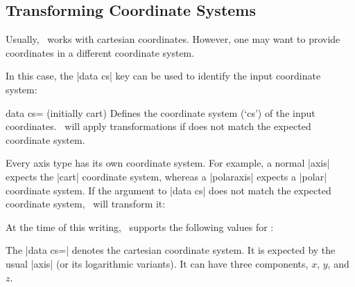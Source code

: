 \subsection{Transforming Coordinate Systems}
\label{key:data:cs}
Usually, \PGFPlots\ works with cartesian coordinates. However, one may want to provide coordinates in a different coordinate system.

In this case, the |data cs| key can be used to identify the input coordinate system:

\begin{pgfplotskey}{data cs= (initially cart)}
	Defines the coordinate system (`cs') of the input coordinates. \PGFPlots\ will apply transformations if  does not match the expected coordinate system.
\begin{codeexample}[]
\end{codeexample}
\begin{codeexample}[]
\end{codeexample}
	Every axis type has its own coordinate system. For example, a normal |axis| expects the |cart| coordinate system, whereas a |polaraxis| expects a |polar| coordinate system. If the argument to |data cs| does not match the expected coordinate system, \PGFPlots\ will transform it:
\begin{codeexample}[]
\end{codeexample}
	
	At the time of this writing, \PGFPlots\ supports the following values for :

	The |data cs=| denotes the cartesian coordinate system. It is expected by the usual |axis| (or its logarithmic variants). It can have three components, $x$, $y$, and $z$.


\end{pgfplotskey}
